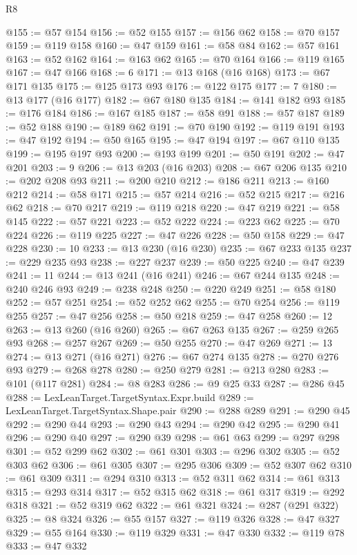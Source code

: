 \begin{lexlean}{R8}
\begin{coremodule}
@155 := @57 @154
@156 := @52 @155
@157 := @156 @62
@158 := @70 @157
@159 := @119 @158
@160 := @47 @159
@161 := @58 @84
@162 := @57 @161
@163 := @52 @162
@164 := @163 @62
@165 := @70 @164
@166 := @119 @165
@167 := @47 @166
@168 := 6
@171 := @13 @168 (@16 @168)
@173 := @67 @171 @135
@175 := @125 @173 @93
@176 := @122 @175
@177 := 7
@180 := @13 @177 (@16 @177)
@182 := @67 @180 @135
@184 := @141 @182 @93
@185 := @176 @184
@186 := @167 @185
@187 := @58 @91
@188 := @57 @187
@189 := @52 @188
@190 := @189 @62
@191 := @70 @190
@192 := @119 @191
@193 := @47 @192
@194 := @50 @165
@195 := @47 @194
@197 := @67 @110 @135
@199 := @195 @197 @93
@200 := @193 @199
@201 := @50 @191
@202 := @47 @201
@203 := 9
@206 := @13 @203 (@16 @203)
@208 := @67 @206 @135
@210 := @202 @208 @93
@211 := @200 @210
@212 := @186 @211
@213 := @160 @212
@214 := @58 @171
@215 := @57 @214
@216 := @52 @215
@217 := @216 @62
@218 := @70 @217
@219 := @119 @218
@220 := @47 @219
@221 := @58 @145
@222 := @57 @221
@223 := @52 @222
@224 := @223 @62
@225 := @70 @224
@226 := @119 @225
@227 := @47 @226
@228 := @50 @158
@229 := @47 @228
@230 := 10
@233 := @13 @230 (@16 @230)
@235 := @67 @233 @135
@237 := @229 @235 @93
@238 := @227 @237
@239 := @50 @225
@240 := @47 @239
@241 := 11
@244 := @13 @241 (@16 @241)
@246 := @67 @244 @135
@248 := @240 @246 @93
@249 := @238 @248
@250 := @220 @249
@251 := @58 @180
@252 := @57 @251
@254 := @52 @252 @62
@255 := @70 @254
@256 := @119 @255
@257 := @47 @256
@258 := @50 @218
@259 := @47 @258
@260 := 12
@263 := @13 @260 (@16 @260)
@265 := @67 @263 @135
@267 := @259 @265 @93
@268 := @257 @267
@269 := @50 @255
@270 := @47 @269
@271 := 13
@274 := @13 @271 (@16 @271)
@276 := @67 @274 @135
@278 := @270 @276 @93
@279 := @268 @278
@280 := @250 @279
@281 := @213 @280
@283 := @101 (@117 @281)
@284 := @8 @283
@286 := @9 @25 @33
@287 := @286 @45
@288 := LexLeanTarget.TargetSyntax.Expr.build
@289 := LexLeanTarget.TargetSyntax.Shape.pair
@290 := @288 @289
@291 := @290 @45
@292 := @290 @44
@293 := @290 @43
@294 := @290 @42
@295 := @290 @41
@296 := @290 @40
@297 := @290 @39
@298 := @61 @63
@299 := @297 @298
@301 := @52 @299 @62
@302 := @61 @301
@303 := @296 @302
@305 := @52 @303 @62
@306 := @61 @305
@307 := @295 @306
@309 := @52 @307 @62
@310 := @61 @309
@311 := @294 @310
@313 := @52 @311 @62
@314 := @61 @313
@315 := @293 @314
@317 := @52 @315 @62
@318 := @61 @317
@319 := @292 @318
@321 := @52 @319 @62
@322 := @61 @321
@324 := @287 (@291 @322)
@325 := @8 @324
@326 := @55 @157
@327 := @119 @326
@328 := @47 @327
@329 := @55 @164
@330 := @119 @329
@331 := @47 @330
@332 := @119 @78
@333 := @47 @332

\end{coremodule}
\end{lexlean}

